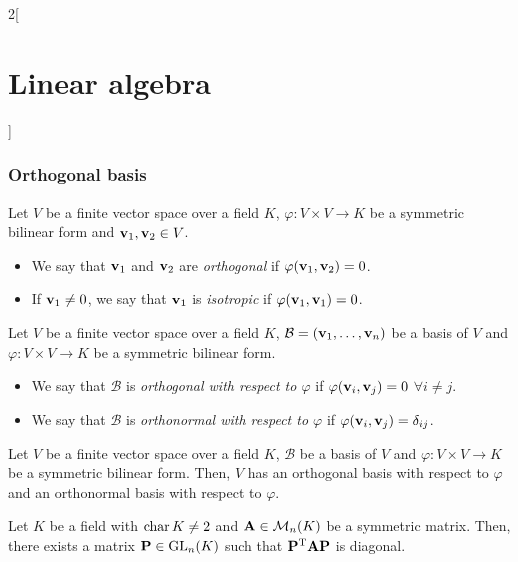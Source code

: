 \documentclass[../../../main.tex]{subfiles}
\begin{document}
\begin{multicols}{2}[\section{Linear algebra}]
  \subsubsection{Orthogonal basis}
  \begin{definition}\label{ALG-isotrop}
    Let $V$ be a finite vector space over a field $K$, $\varphi:V\times V\rightarrow K$ be a symmetric bilinear form and $\boldsymbol{\mathrm{v}}_1,\boldsymbol{\mathrm{v}}_2\in V$.
    \begin{itemize}
      \item We say that $\boldsymbol{\mathrm{v}}_1$ and $\boldsymbol{\mathrm{v}}_2$ are \textit{orthogonal} if $\varphi(\boldsymbol{\mathrm{v}}_1,\boldsymbol{\mathrm{v}}_2)=0$.
      \item If $\boldsymbol{\mathrm{v}}_1\ne 0$, we say that $\boldsymbol{\mathrm{v}}_1$ is \textit{isotropic} if $\varphi(\boldsymbol{\mathrm{v}}_1,\boldsymbol{\mathrm{v}}_1)=0$.
    \end{itemize}
  \end{definition}
  \begin{definition}
    Let $V$ be a finite vector space over a field $K$, $\mathcal{B}=(\boldsymbol{\mathrm{v}}_1,\ldots,\boldsymbol{\mathrm{v}}_n)$ be a basis of $V$ and $\varphi:V\times V\rightarrow K$ be a symmetric bilinear form.
    \begin{itemize}
      \item We say that $\mathcal{B}$ is \textit{orthogonal with respect to $\varphi$} if $\varphi(\boldsymbol{\mathrm{v}}_i,\boldsymbol{\mathrm{v}}_j)=0$ $\forall i\ne j$.
      \item We say that $\mathcal{B}$ is \textit{orthonormal with respect to $\varphi$} if $\varphi(\boldsymbol{\mathrm{v}}_i,\boldsymbol{\mathrm{v}}_j)=\delta_{ij}$.
    \end{itemize}
  \end{definition}
  \begin{theorem}
    Let $V$ be a finite vector space over a field $K$, $\mathcal{B}$ be a basis of $V$ and $\varphi:V\times V\rightarrow K$ be a symmetric bilinear form. Then, $V$ has an orthogonal basis with respect to $\varphi$ and an orthonormal basis with respect to $\varphi$.
  \end{theorem}
  \begin{corollary}
    Let $K$ be a field with $\operatorname{char} K\ne 2$ and $\boldsymbol{\mathrm{A}}\in\mathcal{M}_n(K)$ be a symmetric matrix. Then, there exists a matrix $\boldsymbol{\mathrm{P}}\in\mathrm{GL}_n(K)$ such that $\vb{P}^{\mathrm{T}}\boldsymbol{\mathrm{A}}\boldsymbol{\mathrm{P}}$ is diagonal.
  \end{corollary}

\end{multicols}
\end{document}
